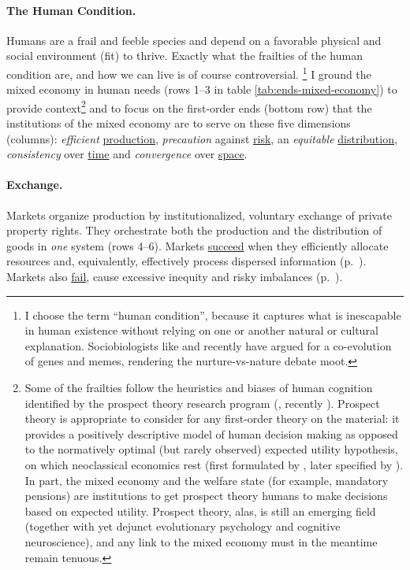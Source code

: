 


\paragraph{The Human Condition.} \label{sec:human-condition}  Humans are a frail and feeble species and depend on a favorable physical and social environment (fit) to thrive.
Exactly what the frailties of the human condition are, and how we can live is of course controversial.
\footnote{
	\label{fn:humancondition}I choose the term ``human condition'', because it captures what is inescapable in human existence without relying on one or another natural or cultural explanation.
	Sociobiologists like \cite{Boyd1985} and recently \cite{Henrich2007} have argued for a co-evolution of genes and memes, rendering the nurture-vs-nature debate moot.
}
I ground the mixed economy in human needs (rows 1--3 in table \ref{tab:ends-mixed-economy}) to provide context\footnote{
	Some of the frailties follow the heuristics and biases of human cognition identified by the prospect theory research program (\citealt{Kahneman1979}, recently \citealt{Kahneman2011}).
	Prospect theory is appropriate to consider for any first-order theory on the material:
	it provides a positively descriptive model of human decision making as opposed to the normatively optimal (but rarely observed) expected utility hypothesis, on which neoclassical economics rest (first formulated by \citealt{Bernoulli1738}, later specified by \citealt{VonNeumann1944}).
	In part, the mixed economy and the welfare state (for example, mandatory pensions) are institutions to get prospect theory humans to make decisions based on expected utility.
	Prospect theory, alas, is still an emerging field (together with yet dejunct evolutionary psychology and cognitive neuroscience), and any link to the mixed economy must in the meantime remain tenuous.
}
and to focus on the first-order ends (bottom row) that the institutions of the mixed economy are to serve on these five dimensions (columns):
\emph{efficient} \hyperref[sec:production]{production}, \emph{precaution} against \hyperref[sec:risk]{risk}, an \emph{equitable} \hyperref[sec:distribution]{distribution}, \emph{consistency} over \hyperref[sec:time]{time} and \emph{convergence} over \hyperref[sec:space]{space}.

\paragraph[Exchange]{Exchange.}  \label{sec:exchange}
Markets organize production by institutionalized, voluntary exchange of private property rights.
They orchestrate both the production and the distribution of goods in \emph{one} system (rows 4--6).
Markets \hyperref[sec:market-solutions-production]{succeed} when they efficiently allocate resources and, equivalently, effectively process dispersed information (p.~\pageref{sec:market-solutions-production}).
Markets also \hyperref[sec:market-failures]{fail}, cause excessive inequity and risky imbalances (p.~\pageref{sec:market-failures}).


